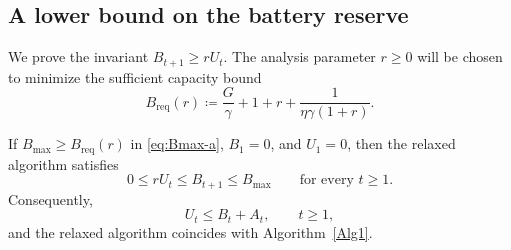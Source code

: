 \subsection{A lower bound on the battery reserve}

We prove the invariant $B_{t+1}\geq rU_t$. The analysis parameter $r\geq0$
will be chosen to minimize the sufficient capacity bound
\begin{equation}
\label{eq:Bmax-a}
    B_{\mathrm{req}}(r)
    \coloneqq\frac G\gamma+1+r+\frac{1}{\eta\gamma(1+r)}.
\end{equation}
\begin{Thm:Theorem}
\label{Theorem of battery}
If $B_{\mathrm{max}}\geq B_{\mathrm{req}}(r)$ in \eqref{eq:Bmax-a},
$B_1=0$, and $U_1=0$, then the relaxed algorithm satisfies
\begin{equation}
\label{eq:induction}
    0\leq rU_t\leq B_{t+1}\leq B_{\mathrm{max}}
    \qquad\text{for every }t\geq1.
\end{equation}
Consequently,
\begin{equation}\label{eq:energy:relaxed-feasibility}
 U_t\leq B_t+A_t,\qquad t\geq1,
\end{equation}
and the relaxed algorithm coincides with Algorithm~\ref{Alg1}.
\end{Thm:Theorem}
